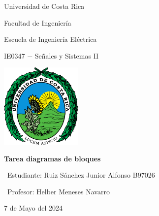 


 

\begin{titlepage}
  \centering
  {\LARGE Universidad de Costa Rica \par} %
  {\Large Facultad de Ingeniería \par} %
  {\Large Escuela de Ingeniería Eléctrica \par} %
  {\Large IE0347 $-$ Señales y Sistemas II \par} %
  \vspace{2cm}
  
  \includegraphics[width=0.3\textwidth]{IMG/imagen1.png} %
  \vspace{1cm}

  {\huge\bfseries Tarea diagramas de bloques \par} %
  \vspace{2cm}
  
  {\Large\ Estudiante: Ruiz Sánchez Junior Alfonso B97026 \par} %
  {\Large\ Profesor: Helber Meneses Navarro \par} %
  \vfill
  
  {\large 7 de Mayo del 2024 \par} %
  \vspace*{\fill}
  
\end{titlepage}

\thispagestyle{empty} %

\renewcommand{\thepage}{\roman{page}}
\newpage

\renewcommand{\thepage}{\arabic{page}} 
\setcounter{page}{1}

\newpage

\newpage




